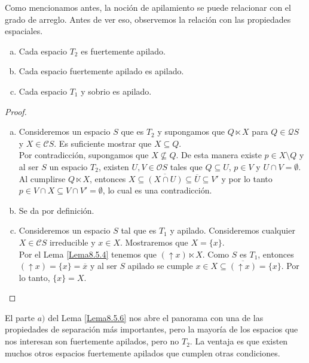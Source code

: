 Como mencionamos antes, la noción de apilamiento se puede relacionar con el grado de arreglo. Antes de ver eso, observemos la relación con las propiedades espaciales.

\begin{lem}\label{Lema8.5.6}
    \begin{enumerate}[a)]
        \item Cada espacio $T_2$ es fuertemente apilado.
        \item Cada espacio fuertemente apilado es apilado.
        \item Cada espacio $T_1$ y sobrio es apilado.
    \end{enumerate}
\end{lem}

\begin{proof}
    \begin{enumerate}[a)]
        \item Consideremos un espacio $S$ que es $T_2$ y supongamos que $Q\ltimes X$ para $Q\in \mathcal{Q}S$ y $X\in \mathcal{C}S$. Es suficiente mostrar que $X\subseteq Q$. \\
        
        Por contradicción, supongamos que $X\nsubseteq Q$. De esta manera existe $p\in X\setminus Q$ y al ser $S$ un espacio $T_2$, existen $U, V\in \mathcal{O}S$ tales que $Q\subseteq U$, $p\in V$ y $U\cap V=\emptyset$. Al cumplirse $Q\ltimes X$, entonces $X\subseteq \overline{(X\cap U)}\subseteq \overline{U}\subseteq V'$ y por lo tanto $p\in V\cap X\subseteq V\cap V'=\emptyset$, lo cual es una contradicción.

        \item Se da por definición.

        \item Consideremos un espacio $S$ tal que es $T_1$ y apilado. Consideremos cualquier $X\in \mathcal{C}S$ irreducible y $x\in X$. Mostraremos que $X=\{x\}$.\\

        Por el Lema \ref{Lema8.5.4} tenemos que $(\uparrow x)\ltimes X$.  Como $S$ es $T_1$, entonces $(\uparrow x)=\{x\}=\overline{x}$ y al ser $S$ apilado se cumple $x\in X\subseteq \overline{(\uparrow x)}=\{x\}$. Por lo tanto, $\{x\}=X$.
    \end{enumerate}
\end{proof}

El parte $a)$ del Lema \ref{Lema8.5.6} nos abre el panorama con una de las propiedades de separación más importantes, pero la mayoría de los espacios que nos interesan son fuertemente apilados, pero no $T_2$. La ventaja es que existen muchos otros espacios fuertemente apilados que cumplen otras condiciones.

